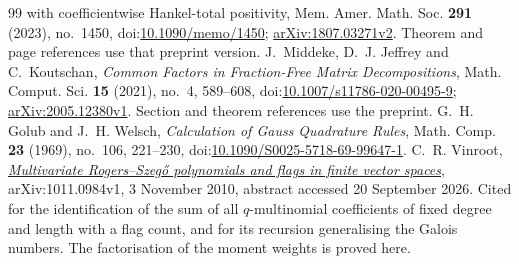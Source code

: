 \begin{thebibliography}{99}
{  with coefficientwise Hankel-total positivity}, Mem. Amer. Math. Soc.
  \textbf{291} (2023), no.~1450,
  doi:\href{https://doi.org/10.1090/memo/1450}{10.1090/memo/1450};
  \href{https://arxiv.org/abs/1807.03271v2}{arXiv:1807.03271v2}.
  Theorem and page references use that preprint version.
 J.~Middeke, D.~J. Jeffrey and C.~Koutschan,
  \emph{Common Factors in Fraction-Free Matrix Decompositions},
  Math. Comput. Sci. \textbf{15} (2021), no.~4, 589--608,
  doi:\href{https://doi.org/10.1007/s11786-020-00495-9}{10.1007/s11786-020-00495-9};
  \href{https://arxiv.org/abs/2005.12380v1}{arXiv:2005.12380v1}.
  Section and theorem references use the preprint.
 G.~H. Golub and J.~H. Welsch,
  \emph{Calculation of Gauss Quadrature Rules}, Math. Comp. \textbf{23}
  (1969), no.~106, 221--230,
  doi:\href{https://doi.org/10.1090/S0025-5718-69-99647-1}{10.1090/S0025-5718-69-99647-1}.
 C.~R. Vinroot,
  \href{https://arxiv.org/abs/1011.0984}{\emph{Multivariate Rogers--Szeg\H{o}
  polynomials and flags in finite vector spaces}}, arXiv:1011.0984v1,
  3 November 2010, abstract accessed 20 September 2026.  Cited for the
  identification of the sum of all $q$-multinomial coefficients of fixed
  degree and length with a flag count, and for its recursion generalising the
  Galois numbers.  The factorisation of the moment weights is proved here.
\end{thebibliography}
